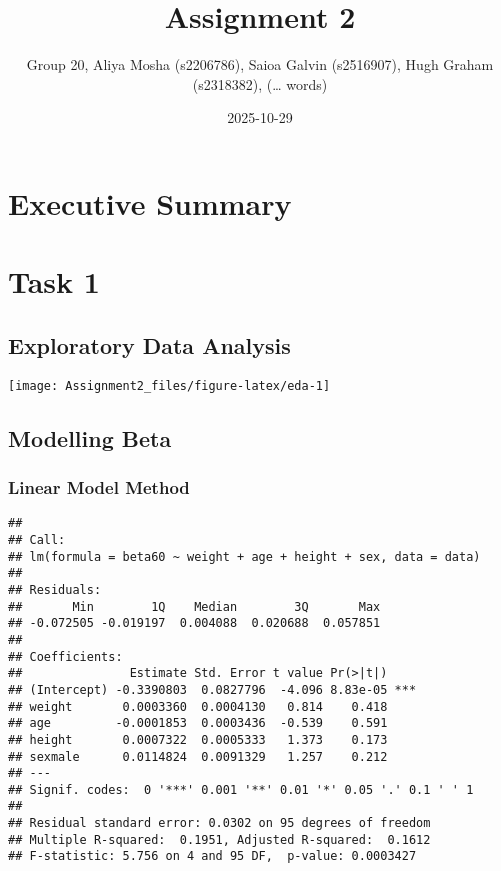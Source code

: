 \documentclass[
]{article}
\title{Assignment 2}
\author{Group 20, Aliya Mosha (s2206786), Saioa Galvin (s2516907), Hugh
Graham (s2318382), (\ldots{} words)}
\date{2025-10-29}
\begin{document}
\maketitle

\section{Executive Summary}\label{executive-summary}

\section{Task 1}\label{task-1}

\subsection{Exploratory Data Analysis}\label{exploratory-data-analysis}

\begin{center}\texttt{[image: Assignment2\_files/figure-latex/eda-1]} \end{center}

\subsection{Modelling Beta}\label{modelling-beta}

\subsubsection{Linear Model Method}\label{linear-model-method}

\begin{verbatim}
## 
## Call:
## lm(formula = beta60 ~ weight + age + height + sex, data = data)
## 
## Residuals:
##       Min        1Q    Median        3Q       Max 
## -0.072505 -0.019197  0.004088  0.020688  0.057851 
## 
## Coefficients:
##               Estimate Std. Error t value Pr(>|t|)    
## (Intercept) -0.3390803  0.0827796  -4.096 8.83e-05 ***
## weight       0.0003360  0.0004130   0.814    0.418    
## age         -0.0001853  0.0003436  -0.539    0.591    
## height       0.0007322  0.0005333   1.373    0.173    
## sexmale      0.0114824  0.0091329   1.257    0.212    
## ---
## Signif. codes:  0 '***' 0.001 '**' 0.01 '*' 0.05 '.' 0.1 ' ' 1
## 
## Residual standard error: 0.0302 on 95 degrees of freedom
## Multiple R-squared:  0.1951, Adjusted R-squared:  0.1612 
## F-statistic: 5.756 on 4 and 95 DF,  p-value: 0.0003427
\end{verbatim}
\end{document}
